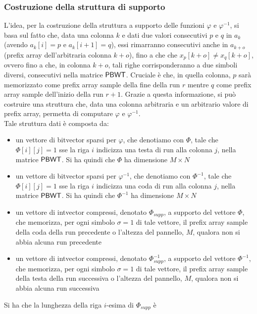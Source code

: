 \subsubsection{Costruzione della struttura di supporto}
L'idea, per la costruzione della struttura a supporto delle
funzioni $\varphi$ e $\varphi^{-1}$, si
basa sul fatto che, data una colonna $k$ e dati due valori consecutivi $p$ e $q$
in $a_k$ (avendo $a_k[i]=p$ e $a_k[i+1]=q$), essi rimarranno consecutivi anche
in $a_{k+o}$ (prefix array dell'arbitraria colonna $k+o$), fino a che
che $x_{p}[k+o]\neq x_{q}[k+o]$, ovvero fino a che, in colonna $k+o$, tali righe
corrisponderanno a due simboli diversi, consecutivi nella matrice
$\mbox{\rm {\sf PBWT}}$. Cruciale è che, in quella colonna, 
$p$ sarà memorizzato come prefix array sample della fine della run $r$
mentre $q$ come prefix array sample dell'inizio della run $r+1$. Grazie
a questa informazione, si può costruire una struttura che, data una colonna
arbitraria e un arbitrario valore di prefix array, permetta di
computare $\varphi$ e $\varphi^{-1}$.\\
Tale struttura dati è composta da:
\begin{itemize}
  \item un vettore di bitvector sparsi per $\varphi$, che denotiamo con
  $\varPhi$, tale che $\varPhi[i][j]=1$ sse la riga $i$ indicizza una testa di
  run alla colonna $j$, nella matrice $\mbox{\rm {\sf PBWT}}$. Si ha quindi che $\varPhi$
  ha dimensione $M\times N$
  \item un vettore di bitvector sparsi per $\varphi^{-1}$, che
  denotiamo con $\varPhi^{-1}$, tale che $\varPhi[i][j]=1$ sse la riga $i$
  indicizza una coda di run alla colonna $j$, nella matrice $\mbox{\rm {\sf PBWT}}$. Si ha
  quindi che $\varPhi^{-1}$ ha dimensione $M\times N$
  \item un vettore di intvector compressi, denotato $\varPhi_{supp}$, a supporto
  del vettore $\varPhi$, che memorizza, per ogni simbolo $\sigma=1$ di tale
  vettore, il 
  prefix array sample della coda della run precedente o l'altezza
  del pannello, $M$, qualora non si abbia alcuna run precedente
  \item un vettore di intvector compressi, denotato $\varPhi^{-1}_{supp}$,
  a supporto del vettore $\varPhi^{-1}$, che memorizza, per ogni simbolo
  $\sigma=1$
  di tale vettore,
  il prefix array sample della testa della run successiva o l'altezza
  del pannello, $M$, qualora non si abbia alcuna run successiva
\end{itemize}
Si ha che la lunghezza della riga $i$-esima di $\varPhi_{supp}$ è
